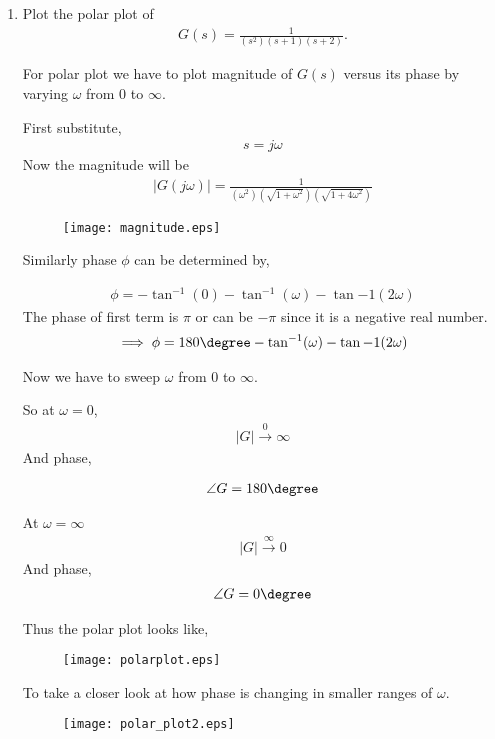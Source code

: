 \begin{enumerate}[label=\thesection.\arabic*.,ref=\thesection.\theenumi]
\item Plot the polar plot of 
\begin{align}
G(s) = \frac{1}{(s^2)(s+1)(s+2)}. 
\end{align}

\solution
For polar plot we have to plot magnitude of $G(s)$ versus its phase
by varying $\omega$ from 0 to $\infty$.

First substitute, 
\begin{align}
    s = j\omega
\end{align}
Now the magnitude will be
\begin{align}
|G(j\omega)| = \frac{1}{(\omega^2)(\sqrt{1 + \omega^2})(\sqrt{1+4\omega^2})} 
\end{align}

\begin{figure}[!h]
  \texttt{[image: magnitude.eps]}
\end{figure}

Similarly phase $\phi$ can be determined by,

\begin{align}
  \phi = - \tan^{-1}(0) - \tan^{-1}(\omega) - \tan{-1}(2\omega)
\end{align}
The phase of first term is $\pi$ or can be $-\pi$ since it is a negative real number.
\begin{align}
    \implies \phi = 180\degree - \tan^{-1}(\omega) - \tan{-1}(2\omega)
\end{align}

Now we have to sweep $\omega$ from 0 to $\infty$.

So at $\omega = 0$,
\begin{align}
    |G| \xrightarrow{0} \infty 
\end{align}
And phase,

\begin{align}
    \angle {G} = 180 \degree
\end{align}

At $\omega = \infty$
\begin{align}
    |G| \xrightarrow{\infty} 0
\end{align}
 And phase,
\begin{align}
    \angle {G} = 0 \degree
\end{align}

Thus the polar plot looks like, 
\newline
\newline
\begin{figure}[!h]
  \texttt{[image: polarplot.eps]}
\end{figure}

To take a closer look at how phase is changing in smaller ranges of $\omega$.
\begin{figure}[!h]
  \texttt{[image: polar\_plot2.eps]}
\end{figure}



\end{enumerate}
